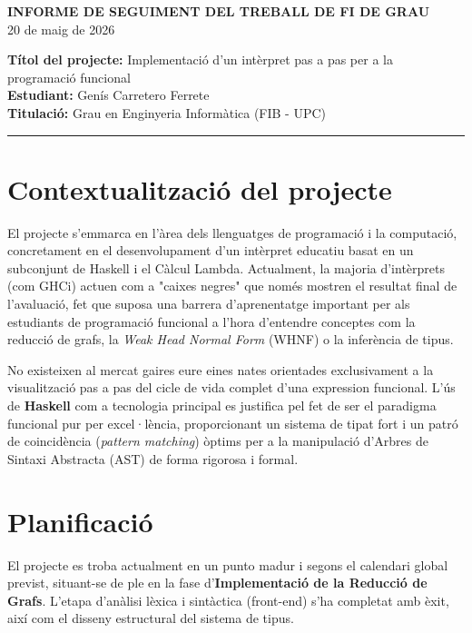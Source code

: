 \documentclass[12pt,a4paper]{article}
\begin{document}
\begin{center}
    \LARGE \textbf{INFORME DE SEGUIMENT DEL TREBALL DE FI DE GRAU} \\[0.4cm]
    \large 20 de maig de 2026
\end{center}

\vspace{0.5cm}

\noindent \textbf{Títol del projecte:} Implementació d'un intèrpret pas a pas per a la programació funcional \\
\noindent \textbf{Estudiant:} Genís Carretero Ferrete\\
\noindent \textbf{Titulació:} Grau en Enginyeria Informàtica (FIB - UPC)

\vspace{0.4cm}
\hrule
\vspace{0.5cm}

\section{Contextualització del projecte}
El projecte s'emmarca en l'àrea dels llenguatges de programació i la computació, concretament en el desenvolupament d'un intèrpret educatiu basat en un subconjunt de Haskell i el Càlcul Lambda. Actualment, la majoria d'intèrprets (com GHCi) actuen com a "caixes negres" que només mostren el resultat final de l'avaluació, fet que suposa una barrera d'aprenentatge important per als estudiants de programació funcional a l'hora d'entendre conceptes com la reducció de grafs, la \textit{Weak Head Normal Form} (WHNF) o la inferència de tipus. 

No existeixen al mercat gaires eure eines nates orientades exclusivament a la visualització pas a pas del cicle de vida complet d'una expression funcional. L'ús de \textbf{Haskell} com a tecnologia principal es justifica pel fet de ser el paradigma funcional pur per excel·lència, proporcionant un sistema de tipat fort i un patró de coincidència (\textit{pattern matching}) òptims per a la manipulació d'Arbres de Sintaxi Abstracta (AST) de forma rigorosa i formal.

\section{Planificació}
El projecte es troba actualment en un punto madur i segons el calendari global previst, situant-se de ple en la fase d'\textbf{Implementació de la Reducció de Grafs}. L'etapa d'anàlisi lèxica i sintàctica (front-end) s'ha completat amb èxit, així com el disseny estructural del sistema de tipus. 
\end{document}

